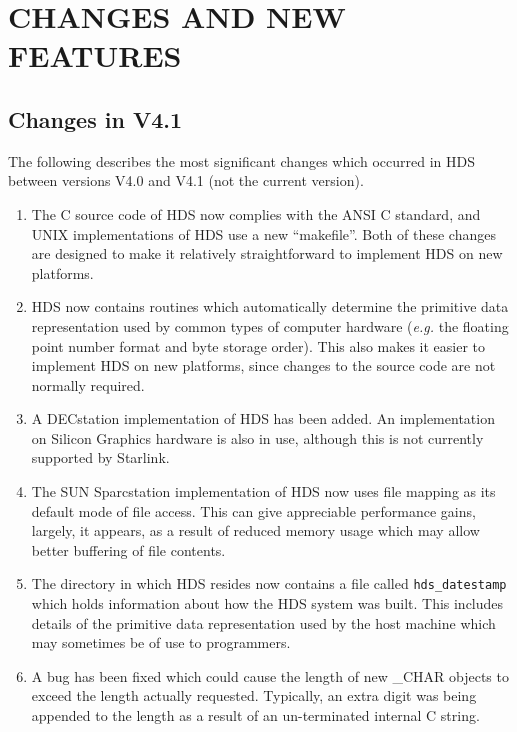 \documentclass[twoside,11pt]{starlink}
\providecommand{\hi}[1]{{\texttt{#1}}}
\providecommand{\qt}[1]{``#1''}
\providecommand{\st}[1]{{\emph{#1}}}
\begin{document}
\newpage
\section{CHANGES AND NEW FEATURES}

\subsection{Changes in V4.1}

The following describes the most significant changes which occurred in HDS
between versions V4.0 and V4.1 (not the current version).

\begin{enumerate}

\item
The C source code of HDS now complies with the ANSI C standard, and
UNIX implementations of HDS use a new \qt{makefile}. Both of these
changes are designed to make it relatively straightforward to
implement HDS on new platforms.

\item
HDS now contains routines which automatically determine the primitive
data representation used by common types of computer hardware
(\st{e.g.} the floating point number format and byte storage
order). This also makes it easier to implement HDS on new platforms,
since changes to the source code are not normally required.

\item
A DECstation implementation of HDS has been added. An implementation
on Silicon Graphics hardware is also in use, although this is not
currently supported by Starlink.

\item
The SUN Sparcstation implementation of HDS now uses file mapping as
its default mode of file access. This can give appreciable performance
gains, largely, it appears, as a result of reduced memory usage which
may allow better buffering of file contents.

\item
The directory in which HDS resides now contains a file called
\hi{hds\_datestamp} which holds information about how the HDS system
was built. This includes details of the primitive data representation
used by the host machine which may sometimes be of use to programmers.

\item
A bug has been fixed which could cause the length of new \_CHAR
objects to exceed the length actually requested. Typically, an extra
digit was being appended to the length as a result of an un-terminated
internal C string.


\end{enumerate}
\end{document}
